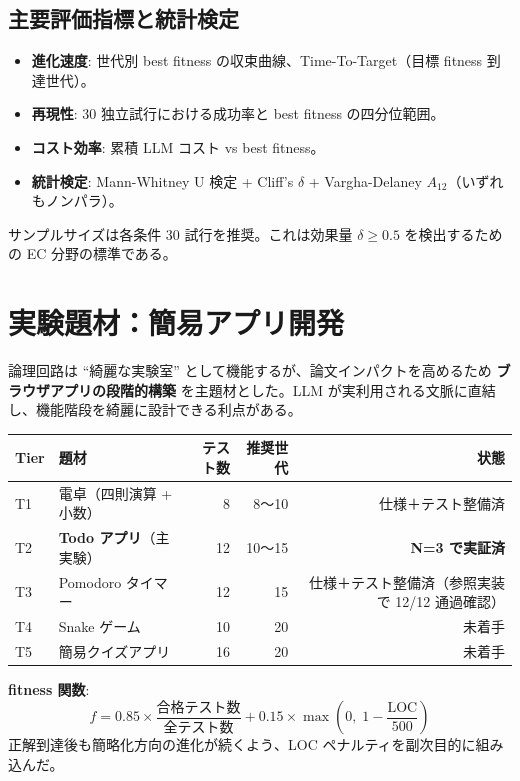 \documentclass[a4paper,11pt]{ltjsarticle}
\begin{document}
\subsection{主要評価指標と統計検定}

\begin{itemize}[leftmargin=2em,itemsep=2pt]
  \item \textbf{進化速度}: 世代別 best fitness の収束曲線、Time-To-Target（目標 fitness 到達世代）。
  \item \textbf{再現性}: 30 独立試行における成功率と best fitness の四分位範囲。
  \item \textbf{コスト効率}: 累積 LLM コスト vs best fitness。
  \item \textbf{統計検定}: Mann-Whitney U 検定 + Cliff's $\delta$ + Vargha-Delaney $A_{12}$（いずれもノンパラ）。
\end{itemize}

サンプルサイズは各条件 30 試行を推奨。これは効果量 $\delta \geq 0.5$ を検出するための EC 分野の標準である。

\section{実験題材：簡易アプリ開発}

論理回路は ``綺麗な実験室'' として機能するが、論文インパクトを高めるため \textbf{ブラウザアプリの段階的構築} を主題材とした。LLM が実利用される文脈に直結し、機能階段を綺麗に設計できる利点がある。

\begin{center}
\begin{tabular}{@{}llrrr@{}}
\toprule
Tier & 題材 & テスト数 & 推奨世代 & 状態 \\
\midrule
T1 & 電卓（四則演算 + 小数）   & 8  & 8〜10  & 仕様＋テスト整備済 \\
T2 & \textbf{Todo アプリ}（主実験）& 12 & 10〜15 & \textbf{N=3 で実証済} \\
T3 & Pomodoro タイマー            & 12 & 15    & 仕様＋テスト整備済（参照実装で 12/12 通過確認）\\
T4 & Snake ゲーム                 & 10 & 20    & 未着手 \\
T5 & 簡易クイズアプリ             & 16 & 20    & 未着手 \\
\bottomrule
\end{tabular}
\end{center}

\textbf{fitness 関数}:
\[
f = 0.85 \times \frac{\text{合格テスト数}}{\text{全テスト数}} + 0.15 \times \max\!\left(0,\; 1 - \frac{\text{LOC}}{500}\right)
\]
正解到達後も簡略化方向の進化が続くよう、LOC ペナルティを副次目的に組み込んだ。
\end{document}
